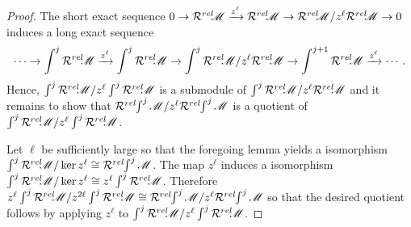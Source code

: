 \begin{proof}
  The short exact sequence $0\to \Rrel\M \xrightarrow{z^\ell}\Rrel \M \to \Rrel\M / z^\ell \Rrel\M \to 0$ induces a long exact sequence
  $$\cdots \to \int^j \Rrel \M \xrightarrow{z^\ell} \int^j \Rrel \M \to \int^j \Rrel\M/z^\ell \Rrel\M \to \int^{j+1} \Rrel \M \xrightarrow{z^\ell}\cdots. $$
  Hence, $\int^j \Rrel \M / z^\ell \int^j \Rrel \M$ is a submodule of $\int^j \Rrel\M/z^\ell \Rrel\M$ and it remains to show that $\Rrel \int^j \M/ z^\ell \Rrel \int^j \M$ is a quotient of $\int^j \Rrel \M / z^\ell \int^j \Rrel \M$.

  Let $\ell$ be sufficiently large so that the foregoing lemma yields a isomorphism $\int^j \Rrel \M / \ker z^\ell \cong \Rrel\int^j \M$. The map $z^\ell$ induces a isomorphism $\int^j \Rrel \M / \ker z^\ell \cong z^\ell \int^j \Rrel \M$. Therefore $z^\ell \int^j \Rrel \M / z^{2\ell}\int^j \Rrel\M \cong \Rrel \int^j \M / z^\ell \Rrel\int^j \M $ so that the desired quotient follows by applying $z^\ell$ to $\int^j \Rrel \M / z^\ell \int^j \Rrel \M$.


\end{proof}
